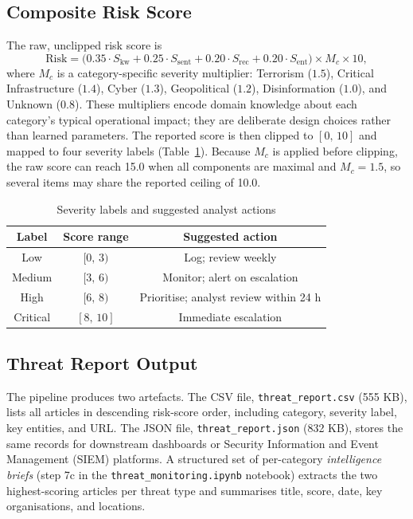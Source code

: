 \documentclass[12pt,lettersize,journal,onecolumn]{IEEEtran}
\begin{document}
\subsection{Composite Risk Score}

The raw, unclipped risk score is
\begin{equation}
  \mathrm{Risk} = \Big(0.35\cdot S_{\mathrm{kw}}
    + 0.25\cdot S_{\mathrm{sent}}
    + 0.20\cdot S_{\mathrm{rec}}
    + 0.20\cdot S_{\mathrm{ent}}\Big)
    \times M_c \times 10,
  \label{eq:risk}
\end{equation}
where $M_c$ is a category-specific severity multiplier: Terrorism ($1.5$), Critical Infrastructure ($1.4$), Cyber ($1.3$), Geopolitical ($1.2$), Disinformation ($1.0$), and Unknown ($0.8$). These multipliers encode domain knowledge about each category's typical operational impact; they are deliberate design choices rather than learned parameters. The reported score is then clipped to $[0,\,10]$ and mapped to four severity labels (Table~\ref{tab:severity}). Because $M_c$ is applied before clipping, the raw score can reach 15.0 when all components are maximal and $M_c=1.5$, so several items may share the reported ceiling of 10.0.

\begin{table}[ht]
\centering
\small
\caption{Severity labels and suggested analyst actions}
\label{tab:severity}
\begin{tabular}{@{}ccc@{}}
\toprule
\textbf{Label} & \textbf{Score range} & \textbf{Suggested action} \\
\midrule
Low      & $[0,\,3)$  & Log; review weekly \\
Medium   & $[3,\,6)$  & Monitor; alert on escalation \\
High     & $[6,\,8)$  & Prioritise; analyst review within 24 h \\
Critical & $[8,\,10]$ & Immediate escalation \\
\bottomrule
\end{tabular}
\end{table}

\subsection{Threat Report Output}

The pipeline produces two artefacts. The CSV file, \texttt{threat\_report.csv} (555 KB), lists all articles in descending risk-score order, including category, severity label, key entities, and URL. The JSON file, \texttt{threat\_report.json} (832 KB), stores the same records for downstream dashboards or Security Information and Event Management (SIEM) platforms. A structured set of per-category \emph{intelligence briefs} (step 7c in the \texttt{threat\_monitoring.ipynb} notebook) extracts the two highest-scoring articles per threat type and summarises title, score, date, key organisations, and locations.
\end{document}
